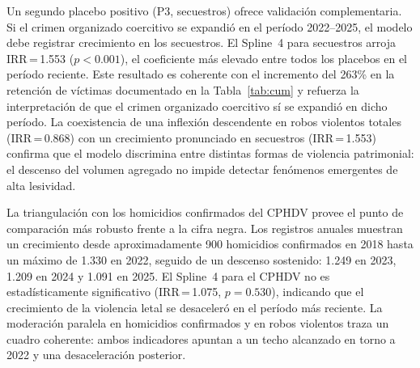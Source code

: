 \documentclass[12pt,a4paper]{article}
\begin{document}
Un segundo placebo positivo (P3, secuestros) ofrece validaci\'on complementaria. Si el
crimen organizado coercitivo se expandi\'o en el per\'iodo 2022--2025, el modelo debe
registrar crecimiento en los secuestros. El Spline~4 para secuestros arroja
IRR\,=\,1.553 ($p<0.001$), el coeficiente m\'as elevado entre todos los placebos en
el per\'iodo reciente. Este resultado es coherente con el incremento del 263\% en la
retenci\'on de v\'ictimas documentado en la Tabla~\ref{tab:cum} y refuerza la
interpretaci\'on de que el crimen organizado coercitivo s\'i se expandi\'o en dicho
per\'iodo. La coexistencia de una inflexi\'on descendente en robos violentos totales
(IRR\,=\,0.868) con un crecimiento pronunciado en secuestros (IRR\,=\,1.553) confirma
que el modelo discrimina entre distintas formas de violencia patrimonial: el descenso
del volumen agregado no impide detectar fen\'omenos emergentes de alta lesividad.

La triangulaci\'on con los homicidios confirmados del CPHDV provee el punto de
comparaci\'on m\'as robusto frente a la cifra negra. Los registros anuales muestran un
crecimiento desde aproximadamente 900 homicidios confirmados en 2018 hasta un m\'aximo
de 1.330 en 2022, seguido de un descenso sostenido: 1.249 en 2023, 1.209 en 2024 y
1.091 en 2025. El Spline~4 para el CPHDV no es estad\'isticamente significativo
(IRR\,=\,1.075, $p=0.530$), indicando que el crecimiento de la violencia letal se
desaceler\'o en el per\'iodo m\'as reciente. La moderaci\'on paralela en homicidios
confirmados y en robos violentos traza un cuadro coherente: ambos indicadores apuntan
a un techo alcanzado en torno a 2022 y una desaceleraci\'on posterior.
\end{document}
